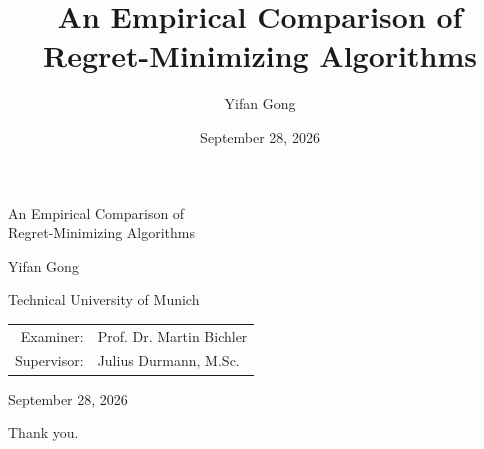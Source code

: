 \documentclass[aspectratio=43,compress,12pt,t]{beamer}
\title{An Empirical Comparison of Regret-Minimizing Algorithms}
\author{Yifan Gong}
\date{September 28, 2026}
\renewcommand{\presentationcontext}{Bachelor's Thesis Defense}
\begin{document}
\begin{frame}[plain]
  \vspace*{1.05cm}

  \begin{center}

    {\color{TUMblue}\LARGE
      An Empirical Comparison of\\[0.12cm]
      Regret-Minimizing Algorithms
    }

    \vspace{0.75cm}

    {\Large Yifan Gong}

    \vspace{0.55cm}

    {\large Technical University of Munich}

    \vspace{0.28cm}

    {\normalsize
    \begin{tabular}{@{}rl@{}}
      Examiner:   & Prof. Dr. Martin Bichler \\
      Supervisor: & Julius Durmann, M.Sc.
    \end{tabular}
    }

    \vspace{0.9cm}

    {\large September 28, 2026}

  \end{center}
\end{frame}















{%
\begin{frame}[noframenumbering]
  \vfill
  \vfill
  \begin{center}
    {\LARGE Thank you.}
  \end{center}
  \vfill
\end{frame}
}

\appendix
\renewcommand{\presentationcontext}{Backup}







\end{document}
